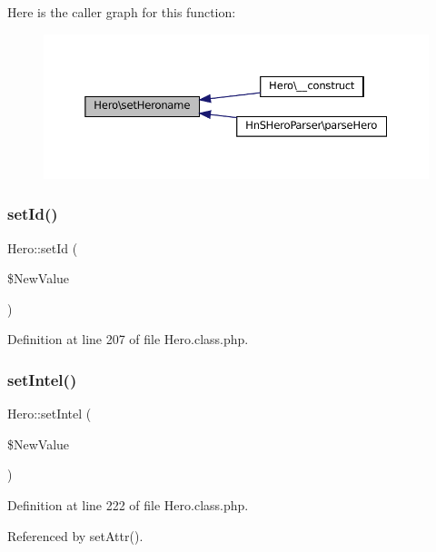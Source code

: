 Here is the caller graph for this function\+:\nopagebreak
\begin{figure}[H]
\begin{center}
\leavevmode
\includegraphics[width=350pt]{class_hero_a10da7e23d594023bf7f2508bb41db1dd_icgraph}
\end{center}
\end{figure}
\mbox{\label{class_hero_ad092df134ab5a5201eacdb4d2db9a7bc}} 
\subsubsection{\texorpdfstring{set\+Id()}{setId()}}
{\footnotesize\ttfamily Hero\+::set\+Id (\begin{DoxyParamCaption}\item[{}]{\$\+New\+Value }\end{DoxyParamCaption})}



Definition at line 207 of file Hero.\+class.\+php.

\mbox{\label{class_hero_a460f54cd686a39877ea25d4ba9ef27f2}} 
\subsubsection{\texorpdfstring{set\+Intel()}{setIntel()}}
{\footnotesize\ttfamily Hero\+::set\+Intel (\begin{DoxyParamCaption}\item[{}]{\$\+New\+Value }\end{DoxyParamCaption})}



Definition at line 222 of file Hero.\+class.\+php.



Referenced by set\+Attr().

